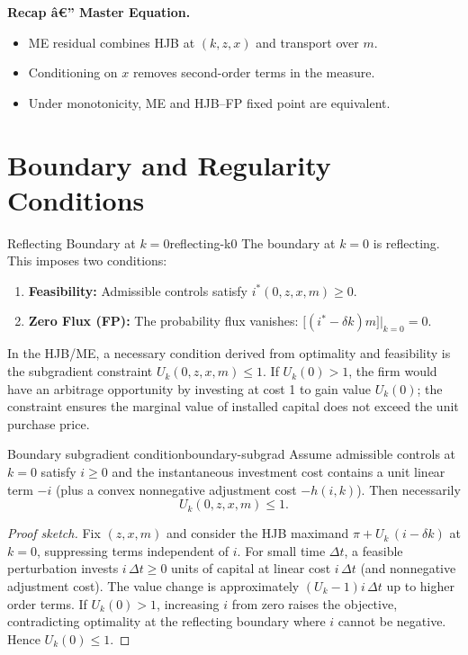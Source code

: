 ﻿\documentclass[11pt,letterpaper,oneside]{article}
\numberwithin{equation}{section}
\newcommand{\1}{\mathbf{1}}
\begin{document}
\begin{tcolorbox}[didacticstyle]
\begin{itemize}[leftmargin=1.1em,itemsep=0.25em]
\begin{tcolorbox}[didacticstyle]
\textbf{Recap â€” Master Equation.}
\begin{itemize}[leftmargin=1.15em,itemsep=0.2em]
  \item ME residual combines HJB at $(k,z,x)$ and transport over $m$.
  \item Conditioning on $x$ removes second-order terms in the measure.
  \item Under monotonicity, ME and HJB--FP fixed point are equivalent.
\end{itemize}
\end{tcolorbox}

\section{Boundary and Regularity Conditions}
\label{sec:boundary-regularity}

\begin{definition}{Reflecting Boundary at $k=0$}{reflecting-k0}
The boundary at $k=0$ is reflecting. This imposes two conditions:
\begin{enumerate}[label=(\roman*),itemsep=0.25em]
    \item \textbf{Feasibility:} Admissible controls satisfy $i^*(0,z,x,m)\ge 0$.
    \item \textbf{Zero Flux (FP):} The probability flux vanishes: $\big[(i^*-\delta k)m\big]\big|_{k=0}=0$.
\end{enumerate}
In the HJB/ME, a necessary condition derived from optimality and feasibility is the subgradient constraint $U_k(0,z,x,m)\le 1$. If $U_k(0)>1$, the firm would have an arbitrage opportunity by investing at cost 1 to gain value $U_k(0)$; the constraint ensures the marginal value of installed capital does not exceed the unit purchase price.
\end{definition}

\begin{proposition}{Boundary subgradient condition}{boundary-subgrad}
Assume admissible controls at $k=0$ satisfy $i\ge 0$ and the instantaneous investment cost contains a unit linear term $-i$ (plus a convex nonnegative adjustment cost $-h(i,k)$). Then necessarily
\[
U_k(0,z,x,m) \le 1.
\]
\end{proposition}
\begin{proof}[Proof sketch]
Fix $(z,x,m)$ and consider the HJB maximand $\pi + U_k\,(i-\delta k)$ at $k=0$, suppressing terms independent of $i$. For small time $\Delta t$, a feasible perturbation invests $i\,\Delta t\ge 0$ units of capital at linear cost $i\,\Delta t$ (and nonnegative adjustment cost). The value change is approximately $(U_k-1)i\,\Delta t$ up to higher order terms. If $U_k(0)>1$, increasing $i$ from zero raises the objective, contradicting optimality at the reflecting boundary where $i$ cannot be negative. Hence $U_k(0)\le 1$.
\end{proof}


\end{itemize}
\end{tcolorbox}
\end{document}

